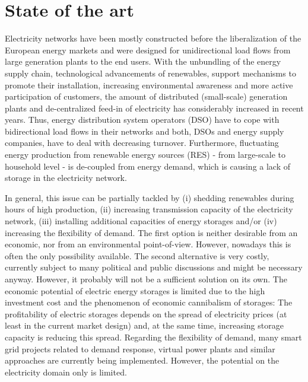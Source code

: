 \documentclass[conference]{IEEEtran}
\begin{document}
\section{State of the art}
\label{sec:soa}
Electricity networks have been mostly constructed before the
liberalization of the European energy markets and were designed for
unidirectional load flows from large generation plants to the end
users. With the unbundling of the energy supply chain, technological
advancements of renewables, support mechanisms to promote their
installation, increasing environmental awareness and more active
participation of customers, the amount of distributed (small-scale)
generation plants and de-centralized feed-in of electricity has
considerably increased in recent years. Thus, energy distribution
system operators (DSO) have to cope with bidirectional load flows in
their networks and both, DSOs and energy supply companies, have to
deal with decreasing turnover. Furthermore, fluctuating energy
production from renewable energy sources (RES) - from large-scale to
household level - is de-coupled from  energy demand, which is 
causing a lack of storage in the electricity network.

In general, this issue can be partially tackled by (i) shedding
renewables during hours of high production, (ii) increasing
transmission capacity of the electricity network, (iii) installing
additional capacities of energy storages and/or (iv) increasing the
flexibility of demand. The first option is neither desirable from an
economic, nor from an environmental point-of-view. However, nowadays
this is often the only possibility available. The second alternative
is very costly, currently subject to many political and public
discussions and might be necessary anyway. However, it probably will
not be a sufficient solution on its own. The economic potential of
electric energy storages is limited due to the high investment cost
and the phenomenon of economic cannibalism of storages: The
profitability of electric storages depends on the spread of
electricity prices (at least in the current market design) and, at
the same time, increasing storage capacity
is reducing this spread. Regarding the flexibility of demand, many
smart grid projects related to demand response, virtual power plants
and similar approaches are currently being implemented. However, the
potential on the electricity domain only is limited. 
\end{document}
